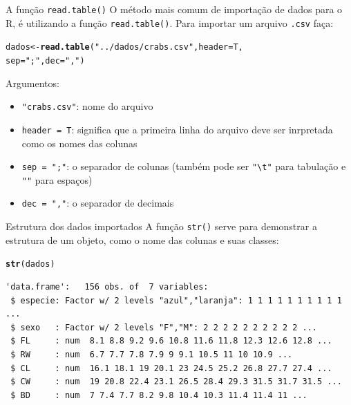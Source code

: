 \documentclass[10pt]{beamer}\usepackage[]{graphicx}\usepackage[]{color}
\makeatletter
\newcommand{\hlstr}[1]{\textcolor[rgb]{0.282,0.239,0.545}{#1}}%
\newcommand{\hlstd}[1]{\textcolor[rgb]{0.345,0.345,0.345}{#1}}%
\newcommand{\hlkwb}[1]{\textcolor[rgb]{0.69,0.353,0.396}{#1}}%
\newcommand{\hlkwc}[1]{\textcolor[rgb]{0.333,0.667,0.333}{#1}}%
\newcommand{\hlkwd}[1]{\textcolor[rgb]{0.282,0.239,0.545}{\textbf{#1}}}%
\newenvironment{kframe}{%
 \def\at@end@of@kframe{}%
 \ifinner\ifhmode%
  \def\at@end@of@kframe{\end{minipage}}%
  \begin{minipage}{\columnwidth}%
 \fi\fi%
 \def\FrameCommand##1{\hskip\@totalleftmargin \hskip-\fboxsep
 \colorbox{shadecolor}{##1}\hskip-\fboxsep
     \hskip-\linewidth \hskip-\@totalleftmargin \hskip\columnwidth}%
 \MakeFramed {\advance\hsize-\width
   \@totalleftmargin\z@ \linewidth\hsize
   \@setminipage}}%
 {\par\unskip\endMakeFramed%
 \at@end@of@kframe}
\newenvironment{knitrout}{}{} %
\makeatother
\begin{document}
\begin{frame}[fragile]{A função \texttt{read.table()}}
O método mais comum de importação de dados para o R, é utilizando a
função \texttt{read.table()}. Para importar um arquivo \texttt{.csv}
faça:
\begin{knitrout}\small
{}\color{fgcolor}\begin{kframe}
\begin{alltt}
\hlstd{dados} \hlkwb{<-} \hlkwd{read.table}\hlstd{(}\hlstr{"../dados/crabs.csv"}\hlstd{,} \hlkwc{header} \hlstd{= T,}
                    \hlkwc{sep} \hlstd{=} \hlstr{";"}\hlstd{,} \hlkwc{dec} \hlstd{=} \hlstr{","}\hlstd{)}
\end{alltt}
\end{kframe}
\end{knitrout}

Argumentos:
\begin{itemize}
\item \verb|"crabs.csv"|: nome do arquivo
\item \texttt{header = T}: significa que a primeira linha do arquivo deve
  ser inrpretada como os nomes das colunas
\item \texttt{sep = ";"}: o separador de colunas (também pode ser
  \verb|"\t"| para tabulação e \verb|""| para espaços)
\item \texttt{dec = ","}: o separador de decimais
\end{itemize}
\end{frame}

\begin{frame}[fragile]{Estrutura dos dados importados}
A função \texttt{str()} serve para demonstrar a estrutura de um objeto,
como o nome das colunas e suas classes:
\begin{knitrout}\small
{}\color{fgcolor}\begin{kframe}
\begin{alltt}
\hlkwd{str}\hlstd{(dados)}
\end{alltt}
\begin{verbatim}
'data.frame':	156 obs. of  7 variables:
 $ especie: Factor w/ 2 levels "azul","laranja": 1 1 1 1 1 1 1 1 1 1 ...
 $ sexo   : Factor w/ 2 levels "F","M": 2 2 2 2 2 2 2 2 2 2 ...
 $ FL     : num  8.1 8.8 9.2 9.6 10.8 11.6 11.8 12.3 12.6 12.8 ...
 $ RW     : num  6.7 7.7 7.8 7.9 9 9.1 10.5 11 10 10.9 ...
 $ CL     : num  16.1 18.1 19 20.1 23 24.5 25.2 26.8 27.7 27.4 ...
 $ CW     : num  19 20.8 22.4 23.1 26.5 28.4 29.3 31.5 31.7 31.5 ...
 $ BD     : num  7 7.4 7.7 8.2 9.8 10.4 10.3 11.4 11.4 11 ...
\end{verbatim}
\end{kframe}
\end{knitrout}

\end{frame}
\end{document}

